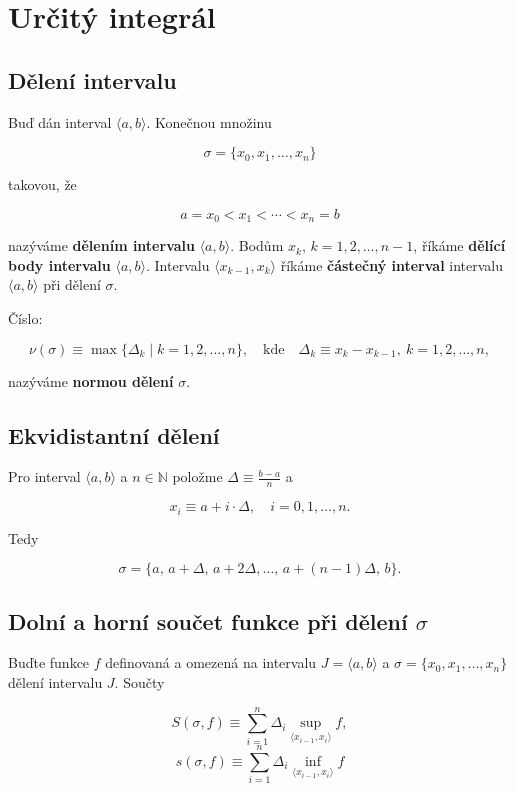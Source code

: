 \section{Určitý integrál}

\subsection*{Dělení intervalu}
Buď dán interval $\langle a, b \rangle$. Konečnou množinu

\[ \sigma = \{x_0, x_1, \ldots, x_n\} \]

\noindent takovou, že

\[ a = x_0 < x_1 < \cdots < x_n = b \]

\noindent nazýváme \textbf{dělením intervalu} $\langle a,b \rangle$. Bodům $x_k$,
$k=1,2,\ldots,n-1$, říkáme \textbf{dělící body intervalu} $\langle a,b
    \rangle$. Intervalu $\langle x_{k-1},x_k \rangle$ říkáme \textbf{částečný
    interval} intervalu $\langle a,b \rangle$ při dělení $\sigma$.

\noindent Číslo:

\[ \nu(\sigma) \equiv \max \{ \Delta_k \mid k = 1,2,\ldots,n \},
    \quad \text{kde} \quad \Delta_k \equiv x_k - x_{k-1}, \ k = 1,2,\ldots,n, \]

\noindent nazýváme \textbf{normou dělení} $\sigma$.

\subsection*{Ekvidistantní dělení}

Pro interval $\langle a,b \rangle$ a $n\in\mathbb{N}$ položme $\Delta \equiv
    \frac{b-a}{n}$ a

\[x_i \equiv a + i\cdot\Delta, \quad i = 0,1,\ldots,n.\]

\noindent Tedy

\[ \sigma = \big\{ a, \, a + \Delta, \, a + 2 \Delta, \ldots, \, a + (n-1)\Delta, \, b \big\}. \]

\subsection*{Dolní a horní součet funkce při dělení $\sigma$}

\noindent Buďte funkce $f$ definovaná a omezená na intervalu $J =\langle a,b \rangle$ a $\sigma = \{x_0,x_1,\ldots,x_n\}$ dělení intervalu $J$. Součty

\[S(\sigma,f) \equiv \sum_{i=1}^n \Delta_i \sup_{\langle x_{i-1},x_i\rangle} f,\]
\[ s(\sigma,f) \equiv \sum_{i=1}^n \Delta_i \inf_{\langle x_{i-1},x_i\rangle} f \]

